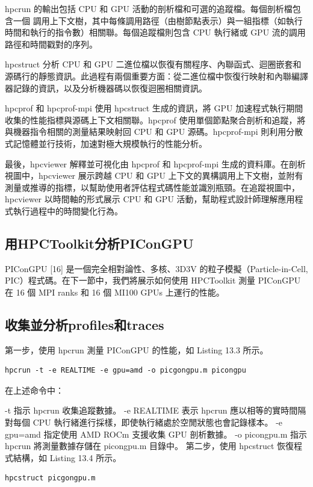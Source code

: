 hpcrun 的輸出包括 CPU 和 GPU 活動的剖析檔和可選的追蹤檔。每個剖析檔包含一個 調用上下文樹，其中每條調用路徑（由樹節點表示）與一組指標（如執行時間和執行的指令數）相關聯。每個追蹤檔則包含 CPU 執行緒或 GPU 流的調用路徑和時間戳對的序列。


hpcstruct 分析 CPU 和 GPU 二進位檔以恢復有關程序、內聯函式、迴圈嵌套和源碼行的靜態資訊。此過程有兩個重要方面：從二進位檔中恢復行映射和內聯編譯器記錄的資訊，以及分析機器碼以恢復迴圈相關資訊。

hpcprof 和 hpcprof-mpi 使用 hpcstruct 生成的資訊，將 GPU 加速程式執行期間收集的性能指標與源碼上下文相關聯。hpcprof 使用單個節點聚合剖析和追蹤，將與機器指令相關的測量結果映射回 CPU 和 GPU 源碼。hpcprof-mpi 則利用分散式記憶體並行技術，加速對極大規模執行的性能分析。

最後，hpcviewer 解釋並可視化由 hpcprof 和 hpcprof-mpi 生成的資料庫。在剖析視圖中，hpcviewer 展示跨越 CPU 和 GPU 上下文的異構調用上下文樹，並附有測量或推導的指標，以幫助使用者評估程式碼性能並識別瓶頸。在追蹤視圖中，hpcviewer 以時間軸的形式展示 CPU 和 GPU 活動，幫助程式設計師理解應用程式執行過程中的時間變化行為。

\subsection{用HPCToolkit分析PIConGPU}
PIConGPU [16] 是一個完全相對論性、多核、3D3V 的粒子模擬（Particle-in-Cell, PIC）程式碼。在下一節中，我們將展示如何使用 HPCToolkit 測量 PIConGPU 在 16 個 MPI ranks 和 16 個 MI100 GPUs 上運行的性能。


\subsection{收集並分析profiles和traces}
第一步，使用 hpcrun 測量 PIConGPU 的性能，如 Listing 13.3 所示。
\begin{lstlisting}[caption={Listing 13.3: Example of the hpcrun command.}]
hpcrun -t -e REALTIME -e gpu=amd -o picgongpu.m picongpu
\end{lstlisting}

在上述命令中：

-t 指示 hpcrun 收集追蹤數據。
-e REALTIME 表示 hpcrun 應以相等的實時間隔對每個 CPU 執行緒進行採樣，即使執行緒處於空閒狀態也會記錄樣本。
-e gpu=amd 指定使用 AMD ROCm 支援收集 GPU 剖析數據。
-o picongpu.m 指示 hpcrun 將測量數據存儲在 picongpu.m 目錄中。
第二步，使用 hpcstruct 恢復程式結構，如 Listing 13.4 所示。

\begin{lstlisting}[caption={Listing 13.4: Example of the hpcstruct command.}]
hpcstruct picgongpu.m
\end{lstlisting}

